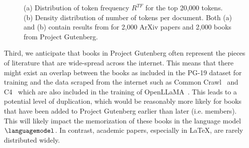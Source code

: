\documentclass[twocolumn,10pt]{article}
\begin{document}
\begin{figure}[ht]
\centering
{}
\label{fig:token_freq}
\caption{(a) Distribution of token frequency $R^{TF}$ for the top 20,000 tokens. (b) Density distribution of number of tokens per document. Both (a) and (b) contain results from for 2,000 ArXiv papers and 2,000 books from Project Gutenberg.} 
\label{fig:papersVSbooks}
\end{figure}

Third, we anticipate that books in Project Gutenberg often represent the pieces of literature that are wide-spread across the internet. This means that there might exist an overlap between the books as included in the PG-19 dataset for training and the data scraped from the internet such as Common Crawl~\cite{commoncrawl} and C4~\cite{raffel2020exploring} which are also included in the training of OpenLLaMA~\cite{openlm2023openllama}. This leads to a potential level of duplication, which would be reasonably more likely for books that have been added to Project Gutenberg earlier than later (i.e. members). This will likely impact the memorization of these books in the language model $\languagemodel$. In contrast, academic papers, especially in LaTeX, are rarely distributed widely. 
\end{document}
